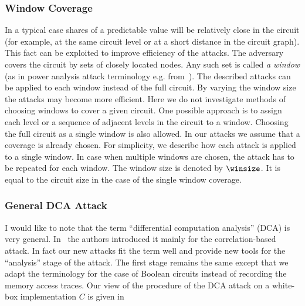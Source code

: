 
\subsubsection{Window Coverage}

In a typical case shares of a predictable value will be relatively close in the circuit (for example, at the same circuit level or at a short distance in the circuit graph).  This fact can be exploited to improve efficiency of the attacks. The adversary covers the circuit by sets of closely located nodes. Any such set is called \emph{a window} (as in power analysis attack terminology e.g. from~\cite{BosApects}). The described attacks can be applied to each window instead of the full circuit. By varying the window size the attacks may become more efficient. Here we do not investigate methods of choosing windows to cover a given circuit. One possible approach is to assign each level or a sequence of adjacent levels in the circuit to a window. Choosing the full circuit as a single window is also allowed. In our attacks we assume that a coverage is already chosen. For simplicity, we describe how each attack is applied to a single window. In case when multiple windows are chosen, the attack has to be repeated for each window. The window size is denoted by $\winsize$. It is equal to the circuit size in the case of the single window coverage.


\subsubsection{General DCA Attack}

I would like to note that the term ``differential computation analysis'' (DCA) is very general. In~\cite{AttackBos} the authors introduced it mainly for the correlation-based attack. In fact our new attacks fit the term well and provide new tools for the ``analysis'' stage of the attack. The first stage remains the same except that we adapt the terminology for the case of Boolean circuits instead of recording the memory access traces. Our view of the procedure of the DCA attack on a white-box implementation $C$ is given in 


